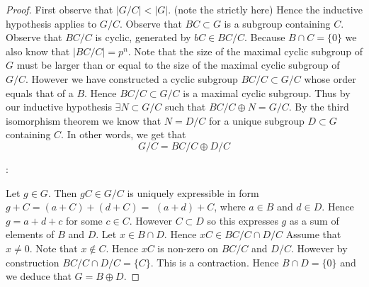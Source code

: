 \documentclass{article}
\begin{document}
\begin{proof}
First observe that $|G / C|<|G|.$ (note the strictly \magenta{$<$} here) Hence the inductive hypothesis applies to $G / C .$ Observe that $B C \subset G$ is a subgroup containing $C$. Observe that $B C / C$ is cyclic, generated by $b C \in B C / C .$ Because $B \cap C=\{0\}$ we also know that $|B C / C|=p^{n} .$ Note that the size of the maximal cyclic subgroup of $G$ must be larger than or equal to the size of the maximal cyclic subgroup of $G / C .$ However we have constructed a cyclic subgroup $B C / C \subset G / C$ whose order equals that of a $B$. Hence $B C / C \subset G / C$ is a maximal cyclic subgroup. Thus by our inductive hypothesis $\exists N \subset G / C$ such that $B C / C \oplus N=G / C .$ By the third isomorphism theorem we know that $N=D / C$ for a unique subgroup $D \subset G$ containing $C .$ In other words, we get that 
$$G / C = B C / C \oplus D/C $$

:

Let $g \in G$. Then $g C \in G / C$ is uniquely expressible in form $g+C=(a+C)+(d+C)=$ $(a+d)+C$, where $a \in B$ and $d \in D .$ Hence $g=a+d+c$ for some $c \in C$. However $C \subset D$ so this expresses $g$ as a sum of elements of $B$ and $D$. Let $x \in B \cap D .$ Hence $x C \in B C / C \cap D / C$ Assume that $x \neq 0$. Note that $x \notin C$. Hence $x C$ is non-zero on $B C / C$ and $D / C$. However by construction $B C / C \cap D / C=\{C\}$. This is a contraction. Hence $B \cap D=\{0\}$ and we deduce that $G=B \oplus D$.
\end{proof}
\end{document}
